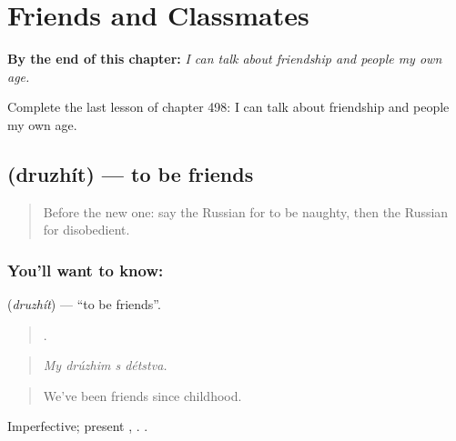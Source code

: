 
\chapter{Friends and Classmates}
\label{ch:ru-friends-and-classmates}

\begin{chapteropening}
\textbf{By the end of this chapter:} \emph{I can talk about friendship and people my own age.}

Complete the last lesson of chapter 498: I can talk about friendship and people my own age.
\end{chapteropening}

\section[\texorpdfstring{\ru{дружить} (druzhít)}{дружить (druzhít)}]{ (druzhít) — to be friends}

\label{lesson:RU-C498-druzhit}



\begin{quote}
Before the new one: say the Russian for to be naughty, then the Russian for disobedient.
\end{quote}

\subsection*{You'll want to know: }
\textbf{} (\emph{druzhít}) — \textquotedblleft{}to be friends\textquotedblright{}.

\begin{quote}
   .
\end{quote}

\begin{quote}
\emph{My drúzhim s détstva.}
\end{quote}

\begin{quote}
We've been friends since childhood.
\end{quote}

Imperfective; present , . \emph{  }.

